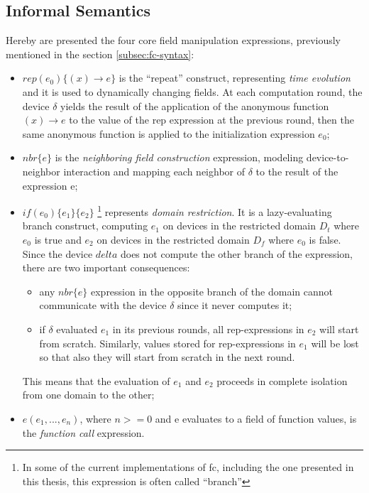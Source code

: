 \subsection{Informal Semantics}
\label{subsec:fc-semantics}
Hereby are presented the four core field manipulation expressions, previously mentioned in the section \ref{subsec:fc-syntax}:

\begin{itemize}
    \item $rep(e_0)\{(x) \rightarrow e\}$ is the ``repeat'' construct, representing \textit{time evolution} and it is used to dynamically changing fields. At each computation round,
          the device $\delta$ yields the result of the application of the anonymous function $(x) \rightarrow e$ to the value of the rep expression at the previous round, then the same anonymous function is
          applied to the initialization expression $e_0$;
    \item $nbr\{e\}$ is the \textit{neighboring field construction} expression, modeling device-to-neighbor interaction and mapping each neighbor of $\delta$ to the result of the expression e;
    \item $if(e_0)\{e_1\}\{e_2\}$ \footnote[01]{In some of the current implementations of \ac{fc}, including the one presented in this thesis, this expression is often called ``branch''}
          represents \textit{domain restriction}. It is a lazy-evaluating branch construct, computing $e_1$ on devices in the restricted domain $D_t$ where $e_0$ is true and $e_2$ on devices in the restricted domain $D_f$ where $e_0$ is false.
          Since the device $delta$ does not compute the other branch of the expression, there are two important consequences:
          \begin{itemize}
              \item any $nbr\{e\}$ expression in the opposite branch of the domain cannot communicate with the device $\delta$ since it never computes it;
              \item if $\delta$ evaluated $e_1$ in its previous rounds, all rep-expressions in $e_2$ will start from scratch.
                    Similarly, values stored for rep-expressions in $e_1$ will be lost so that also they will start from scratch in the next round.
          \end{itemize}
          This means that the evaluation of $e_1$ and $e_2$ proceeds in complete isolation from one domain to the other;
    \item $e(e_1, ..., e_n)$, where $n>=0$ and e evaluates to a field of function values, is the \textit{function call} expression.
\end{itemize}



